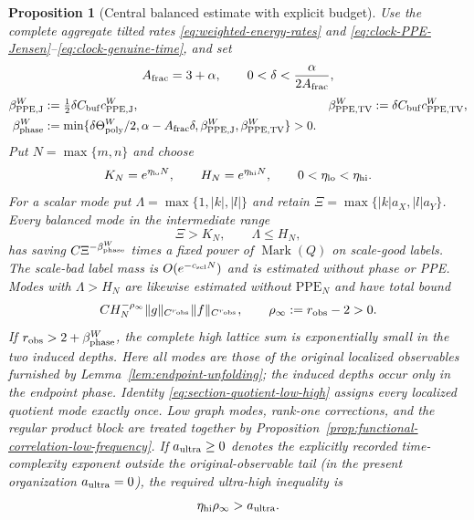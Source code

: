 \documentclass[11pt]{article}
\newtheorem{proposition}[theorem]{Proposition}
\begin{document}
\begin{proposition}[Central balanced estimate with explicit budget]
\label{prop:central-phase-verification}
Use the complete aggregate tilted rates
\eqref{eq:weighted-energy-rates} and
\eqref{eq:clock-PPE-Jensen}--\eqref{eq:clock-genuine-time}, and set
\[
 A_{\rm frac}=3+\alpha,\qquad
 0<\delta<\frac{\alpha}{2A_{\rm frac}},
\]
\begin{equation}
\label{eq:complete-phase-exponent}
\begin{aligned}
 \beta_{\rm PPE,J}^{W}&:=\tfrac12\delta C_{\rm buf}c_{\rm PPE,J}^{W},
 &\beta_{\rm PPE,TV}^{W}&:=\delta C_{\rm buf}c_{\rm PPE,TV}^{W},\\
 \beta_{\rm phase}^{W}&:=
 \min\{\delta\Theta_{\rm poly}^{W}/2,\alpha-A_{\rm frac}\delta,
             \beta_{\rm PPE,J}^{W},\beta_{\rm PPE,TV}^{W}\}>0.
\end{aligned}
\end{equation}
Put $N=\max\{m,n\}$ and choose
\begin{equation}
\label{eq:three-frequency-cutoffs}
 K_N=e^{\eta_{\rm lo}N},\qquad
 H_N=e^{\eta_{\rm hi}N},\qquad
 0<\eta_{\rm lo}<\eta_{\rm hi}.
\end{equation}
For a scalar mode put
$\Lambda=\max\{1,|k|,|l|\}$ and retain
$\Xi=\max\{|k|a_X,|l|a_Y\}$.  Every balanced mode in the intermediate range
\begin{equation}
\label{eq:intermediate-phase-range}
 \Xi>K_N,\qquad \Lambda\le H_N,
\end{equation}
has saving \(C\Xi^{-\beta_{\rm phase}^{W}}\) times a fixed power of
\(\operatorname{Mark}(Q)\) on scale-good labels.  The scale-bad label mass is
$O(e^{-c_{\rm scl}N})$ and is estimated without phase or PPE.  Modes with
$\Lambda>H_N$ are likewise estimated without
$\mathrm{PPE}_{N}$ and have total bound
\begin{equation}
\label{eq:ultra-high-observable-tail}
 C H_N^{-\rho_\infty}\|g\|_{C^{r_{\rm obs}}}
 \|f\|_{C^{r_{\rm obs}}},\qquad
 \rho_\infty:=r_{\rm obs}-2>0.
\end{equation}
If $r_{\rm obs}>2+\beta_{\rm phase}^{W}$, the complete high lattice sum is
exponentially small in the two induced depths.  Here all modes are those of the original
localized observables furnished by Lemma~\ref{lem:endpoint-unfolding}; the
induced depths occur only in the endpoint phase.  Identity
\eqref{eq:section-quotient-low-high} assigns every localized quotient mode
exactly once.  Low graph modes, rank-one corrections, and
the regular product block are treated together by
Proposition~\ref{prop:functional-correlation-low-frequency}.  If
$a_{\rm ultra}\ge0$ denotes the explicitly recorded time-complexity exponent
outside the original-observable tail (in the present organization
$a_{\rm ultra}=0$), the required ultra-high inequality is
\begin{equation}
\label{eq:ultra-high-exponent-window}
 \eta_{\rm hi}\rho_\infty>a_{\rm ultra}.
\end{equation}
\end{proposition}
\end{document}
